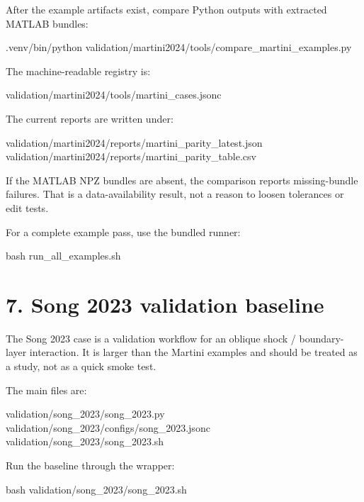 \documentclass[11pt,a4paper]{article}
\begin{document}
After the example artifacts exist, compare Python outputs with extracted MATLAB bundles:

\begin{commandbox}
.venv/bin/python validation/martini2024/tools/compare_martini_examples.py
\end{commandbox}

The machine-readable registry is:

\begin{outputbox}
validation/martini2024/tools/martini_cases.jsonc
\end{outputbox}

The current reports are written under:

\begin{outputbox}
validation/martini2024/reports/martini_parity_latest.json
validation/martini2024/reports/martini_parity_table.csv
\end{outputbox}

\begin{warningbox}
If the MATLAB NPZ bundles are absent, the comparison reports missing-bundle failures. That is a data-availability result, not a reason to loosen tolerances or edit tests.
\end{warningbox}

For a complete example pass, use the bundled runner:

\begin{commandbox}
bash run_all_examples.sh
\end{commandbox}

\section*{7. Song 2023 validation baseline}

The Song 2023 case is a validation workflow for an oblique shock / boundary-layer interaction. It is larger than the Martini examples and should be treated as a study, not as a quick smoke test.

The main files are:

\begin{outputbox}
validation/song_2023/song_2023.py
validation/song_2023/configs/song_2023.jsonc
validation/song_2023/song_2023.sh
\end{outputbox}

Run the baseline through the wrapper:

\begin{commandbox}
bash validation/song_2023/song_2023.sh
\end{commandbox}
\end{document}
